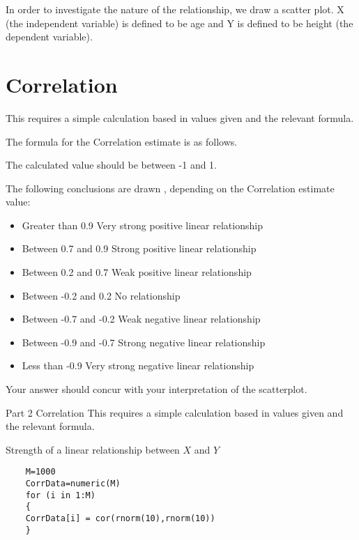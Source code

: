 \documentclass[]{report}
\begin{document}

In order to investigate the nature of the relationship, we draw a
scatter plot.
X (the independent variable) is defined to be age and Y is defined
to be height (the dependent variable).




\section{Correlation}

This requires a simple calculation based in values given and the relevant formula.

The formula for the Correlation estimate is as follows.

The calculated value should be between -1 and 1.

The following conclusions are drawn , depending on the Correlation estimate value:
\begin{itemize}
	\item Greater than 0.9 		Very strong positive linear relationship 
	\item Between 0.7 and 0.9		Strong positive linear relationship 
	\item Between 0.2 and 0.7	 	Weak positive linear relationship
	\item Between -0.2 and 0.2		No relationship
	\item Between -0.7 and -0.2		Weak negative linear relationship
	\item Between -0.9 and -0.7		Strong negative linear relationship
	\item Less than -0.9			Very strong negative linear relationship
\end{itemize}
Your answer should concur with your interpretation of the scatterplot.


Part 2 Correlation
This requires a simple calculation based in values given and the relevant formula.






Strength of a linear relationship between $X$ and $Y$

\begin{framed}
	\begin{verbatim}
	M=1000
	CorrData=numeric(M)
	for (i in 1:M)
	{
	CorrData[i] = cor(rnorm(10),rnorm(10))
	}
	\end{verbatim}
\end{framed}
\end{document}
